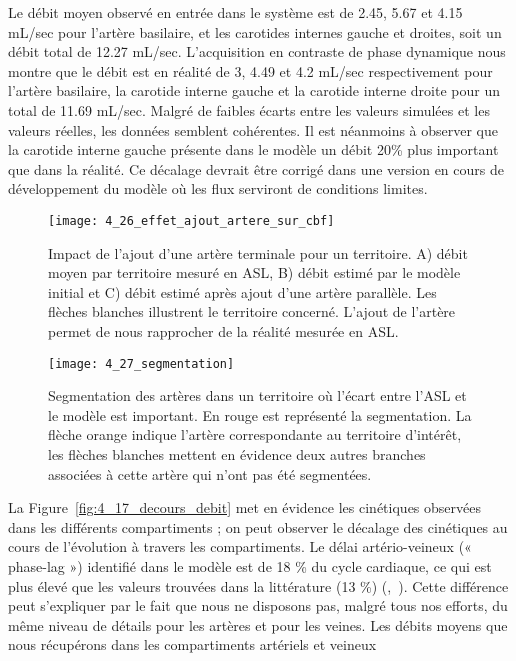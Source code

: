 Le débit moyen observé en entrée dans le système est de 2.45, 5.67 et 4.15 mL/sec pour
l’artère basilaire, et les carotides internes gauche et droites, soit un débit total de 12.27 mL/sec.
L’acquisition en contraste de phase dynamique nous montre que le débit est en réalité de 3, 4.49 et
4.2 mL/sec respectivement pour l’artère basilaire, la carotide interne gauche et la carotide interne
droite pour un total de 11.69 mL/sec. Malgré de faibles écarts entre les valeurs simulées et les valeurs
réelles, les données semblent cohérentes. Il est néanmoins à observer que la carotide interne gauche
présente dans le modèle un débit 20\% plus important que dans la réalité. Ce décalage devrait être
corrigé dans une version en cours de développement du modèle où les flux serviront de conditions
limites.\\
\begin{figure}[!t]
\centering
\texttt{[image: 4\_26\_effet\_ajout\_artere\_sur\_cbf]}
\caption{Impact de l'ajout d'une artère terminale pour un territoire. A) débit moyen par territoire mesuré en ASL, B) débit estimé par le modèle initial et C) débit estimé après ajout d'une artère parallèle. Les flèches blanches illustrent le territoire concerné. L'ajout de l'artère permet de nous rapprocher de la réalité mesurée en ASL.}
\label{fig:4_26_effet_ajout_artere_sur_cbf}	
\end{figure}
\begin{figure}[!b]
\centering
\texttt{[image: 4\_27\_segmentation]}
\caption{Segmentation des artères dans un territoire où l'écart entre l'ASL et le modèle est important. En rouge est représenté la segmentation. La flèche orange indique l'artère correspondante au territoire d'intérêt, les flèches blanches mettent en évidence deux autres branches associées à cette artère qui n'ont pas été segmentées.}
\label{fig:4_27_segmentation}	
\end{figure}
La Figure~\ref{fig:4_17_decours_debit} met en évidence les cinétiques observées dans les différents compartiments ; on
peut observer le décalage des cinétiques au cours de l’évolution à travers les compartiments. Le délai
artério-veineux (« phase-lag ») identifié dans le modèle est de 18 \% du cycle cardiaque, ce qui est plus
élevé que les valeurs trouvées dans la littérature (13 \%) (\cite{Linninger2009},~\cite{Kim2007}). Cette différence peut s’expliquer par
le fait que nous ne disposons pas, malgré tous nos efforts, du même niveau de détails pour les artères
et pour les veines. Les débits moyens que nous récupérons dans les compartiments artériels et veineux
